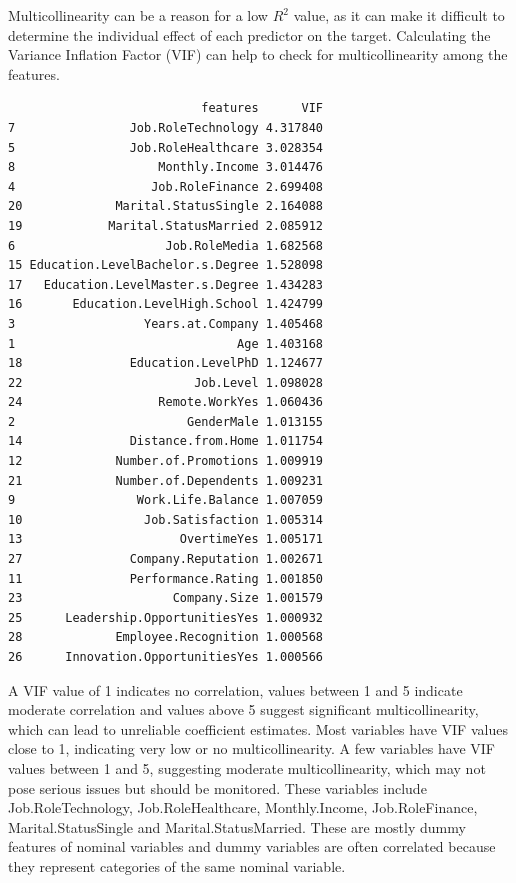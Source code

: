 \documentclass[
  10pt,
  paper=a4,
  ,captions=tableheading
]{scrartcl}
\newenvironment{Shaded}{\begin{snugshade}}{\end{snugshade}}
\newcommand{\AttributeTok}[1]{\textcolor[rgb]{0.13,0.29,0.53}{#1}}
\newcommand{\ConstantTok}[1]{\textcolor[rgb]{0.56,0.35,0.01}{#1}}
\newcommand{\FunctionTok}[1]{\textcolor[rgb]{0.13,0.29,0.53}{\textbf{#1}}}
\newcommand{\NormalTok}[1]{#1}
\newcommand{\OtherTok}[1]{\textcolor[rgb]{0.56,0.35,0.01}{#1}}
\newcommand{\SpecialCharTok}[1]{\textcolor[rgb]{0.81,0.36,0.00}{\textbf{#1}}}
\begin{document}
Multicollinearity can be a reason for a low \(R^2\) value, as it can
make it difficult to determine the individual effect of each predictor
on the target. Calculating the Variance Inflation Factor (VIF) can help
to check for multicollinearity among the features.

\small

\begin{Shaded}
\end{Shaded}

\begin{verbatim}
                           features      VIF
7                Job.RoleTechnology 4.317840
5                Job.RoleHealthcare 3.028354
8                    Monthly.Income 3.014476
4                   Job.RoleFinance 2.699408
20             Marital.StatusSingle 2.164088
19            Marital.StatusMarried 2.085912
6                     Job.RoleMedia 1.682568
15 Education.LevelBachelor.s.Degree 1.528098
17   Education.LevelMaster.s.Degree 1.434283
16       Education.LevelHigh.School 1.424799
3                  Years.at.Company 1.405468
1                               Age 1.403168
18               Education.LevelPhD 1.124677
22                        Job.Level 1.098028
24                   Remote.WorkYes 1.060436
2                        GenderMale 1.013155
14               Distance.from.Home 1.011754
12             Number.of.Promotions 1.009919
21             Number.of.Dependents 1.009231
9                 Work.Life.Balance 1.007059
10                 Job.Satisfaction 1.005314
13                      OvertimeYes 1.005171
27               Company.Reputation 1.002671
11               Performance.Rating 1.001850
23                     Company.Size 1.001579
25      Leadership.OpportunitiesYes 1.000932
28             Employee.Recognition 1.000568
26      Innovation.OpportunitiesYes 1.000566
\end{verbatim}

\small

A VIF value of 1 indicates no correlation, values between 1 and 5
indicate moderate correlation and values above 5 suggest significant
multicollinearity, which can lead to unreliable coefficient estimates.
Most variables have VIF values close to 1, indicating very low or no
multicollinearity. A few variables have VIF values between 1 and 5,
suggesting moderate multicollinearity, which may not pose serious issues
but should be monitored. These variables include Job.RoleTechnology,
Job.RoleHealthcare, Monthly.Income, Job.RoleFinance,
Marital.StatusSingle and Marital.StatusMarried. These are mostly dummy
features of nominal variables and dummy variables are often correlated
because they represent categories of the same nominal variable.
\end{document}
